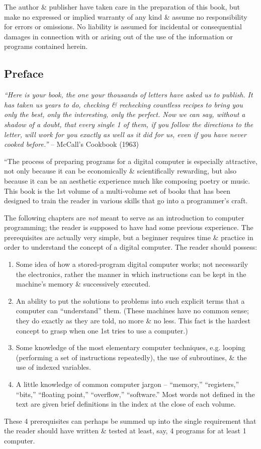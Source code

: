 \documentclass{article}
\begin{document}
The author \& publisher have taken care in the preparation of this book, but make no expressed or implied warranty of any kind \& assume no responsibility for errors or omissions. No liability is assumed for incidental or consequential damages in connection with or arising out of the use of the information or programs contained herein.

\subsection{Preface}
{\it``Here is your book, the one your thousands of letters have asked us to publish. It has taken us years to do, checking \& rechecking countless recipes to bring you only the best, only the interesting, only the perfect. Now we can say, without a shadow of a doubt, that every single 1 of them, if you follow the directions to the letter, will work for you exactly as well as it did for us, even if you have never cooked before.''} -- {\sc McCall}'s Cookbook (1963)

``The process of preparing programs for a digital computer is especially attractive, not only because it can be economically \& scientifically rewarding, but also because it can be an aesthetic experience much like composing poetry or music. This book is the 1st volume of a multi-volume set of books that has been designed to train the reader in various skills that go into a programmer's craft.

The following chapters are {\it not} meant to serve as an introduction to computer programming; the reader is supposed to have had some previous experience. The prerequisites are actually very simple, but a beginner requires time \& practice in order to understand the concept of a digital computer. The reader should
possess:
\begin{enumerate}
	\item Some idea of how a stored-program digital computer works; not necessarily the electronics, rather the manner in which instructions can be kept in the machine's memory \& successively executed.
	\item An ability to put the solutions to problems into such explicit terms that a computer can ``understand'' them. (These machines have no common sense; they do exactly as they are told, no more \& no less. This fact is the hardest concept to grasp when one 1st tries to use a computer.)
	\item Some knowledge of the most elementary computer techniques, e.g. looping (performing a set of instructions repeatedly), the use of subroutines, \& the use of indexed variables.
	\item A little knowledge of common computer jargon -- ``memory,'' ``registers,'' ``bits,'' ``floating point,'' ``overflow,'' ``software.'' Most words not defined in the text are given brief definitions in the index at the close of each volume.
\end{enumerate}
These 4 prerequisites can perhaps be summed up into the single requirement that the reader should have written \& tested at least, say, 4 programs for at least 1 computer.
\end{document}
